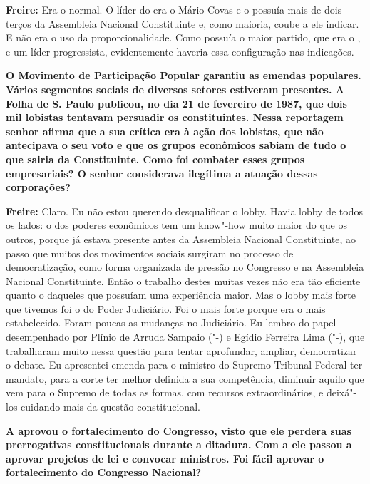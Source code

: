 \textbf{Freire:} Era o normal. O líder do  era o Mário Covas e o
 possuía mais de dois terços da Assembleia Nacional Constituinte e,
como maioria, coube a ele indicar. E não era o uso da proporcionalidade.
Como possuía o maior partido, que era o , e um líder progressista,
evidentemente haveria essa configuração nas indicações.

\textbf{O Movimento de Participação Popular garantiu as emendas
populares. Vários segmentos sociais de diversos setores estiveram
presentes. A Folha de S. Paulo publicou, no dia 21 de fevereiro de 1987,
que dois mil lobistas tentavam persuadir os constituintes. Nessa
reportagem senhor afirma que a sua crítica era à ação dos lobistas, que
não antecipava o seu voto e que os grupos econômicos sabiam de tudo o
que sairia da Constituinte. Como foi combater esses grupos empresariais?
O senhor considerava ilegítima a atuação dessas corporações?}

\textbf{Freire:} Claro. Eu não estou querendo desqualificar o lobby.
Havia lobby de todos os lados: o dos poderes econômicos tem um know"-how
muito maior do que os outros, porque já estava presente antes da
Assembleia Nacional Constituinte, ao passo que muitos dos movimentos
sociais surgiram no processo de democratização, como forma organizada de
pressão no Congresso e na Assembleia Nacional Constituinte. Então o
trabalho destes muitas vezes não era tão eficiente quanto o daqueles que
possuíam uma experiência maior. Mas o lobby mais forte que tivemos foi o
do Poder Judiciário. Foi o mais forte porque era o mais estabelecido.
Foram poucas as mudanças no Judiciário. Eu lembro do papel desempenhado
por Plínio de Arruda Sampaio ("-) e Egídio Ferreira Lima ("-),
que trabalharam muito nessa questão para tentar aprofundar, ampliar,
democratizar o debate. Eu apresentei emenda para o ministro do Supremo
Tribunal Federal ter mandato, para a corte ter melhor definida a sua
competência, diminuir aquilo que vem para o Supremo de todas as formas,
com recursos extraordinários, e deixá"-los cuidando mais da questão
constitucional.

\textbf{A  aprovou o fortalecimento do Congresso, visto que ele
perdera suas prerrogativas constitucionais durante a ditadura. Com a 
ele passou a aprovar projetos de lei e convocar ministros. Foi fácil
aprovar o fortalecimento do Congresso Nacional?}

